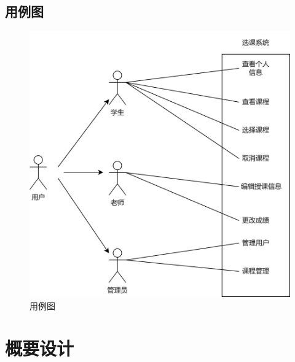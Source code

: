 \documentclass[12pt, a4paper]{article}
\begin{document}
\subsection{用例图}
\begin{figure}[H]
	\centering
	\includegraphics[width = 0.8 \textwidth]{usecase.png}
	\caption{用例图}
\end{figure}

\section{概要设计}
\end{document}
